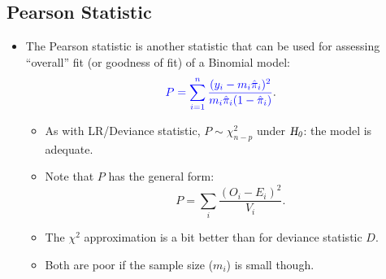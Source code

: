 \documentclass{article}\usepackage[]{graphicx}\usepackage[svgnames]{xcolor}
\newcommand{\HN}{\textsl{H}_{\textsl{0}}}%
\begin{document}
\subsection*{Pearson Statistic}
\begin{itemize}
      \item The Pearson statistic is another statistic that can be used for assessing
            ``overall'' fit (or goodness of fit) of a Binomial model:
            \[ \textcolor{Blue}{P=\sum_{i=1}^{n} \frac{(y_i-m_i\hat{\pi}_i)^2}{m_i\hat{\pi}_i(1-\hat{\pi}_i)}}. \]
            \begin{itemize}
                  \item As with LR/Deviance statistic, $ P \sim \chi^2_{n-p} $ under $ \HN $: the model is adequate.
                  \item Note that $ P $ has the general form:
                        \[ P=\sum_{i}\frac{(O_i-E_i)^2}{V_i}.   \]
                  \item The $ \chi^2 $ approximation is a bit better than for deviance statistic $ D $.
                  \item Both are poor if the sample size ($ m_i $) is small though.
            \end{itemize}
\end{itemize}
\end{document}

